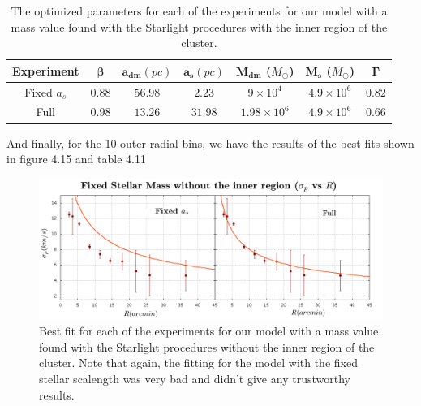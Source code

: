 \begin{table}[H]
\begin{center}
\begin{tabular}{| c| c| c| c| c| c| c|}
    \hline
    \textbf{Experiment} & $\mathbf{\beta}$ & $\mathbf{a_{dm}} (pc)$ & $\mathbf{a_{s}} (pc)$ & $\mathbf{M_{dm}}$ ($M_{\odot}$) & $\mathbf{M_{s}}$ ($M_{\odot}$) & $\mathbf{\Gamma}$\\ \hline
	Fixed $a_s$ &	$0.88$ &	$56.98$ &	$2.23$ &	$9 \times 10^{4}$ &	$4.9 \times 10 ^{6}$ &	$0.82$\\ \hline
	Full &	$0.98$ &	$13.26$ &	$31.98$ &	$1.98 \times 10^{6}$ &	$4.9 \times 10^{6}$ &	$0.66$\\ \hline
  \end{tabular} 
\caption[Optimized parameters for our model with a mass value based on the Starlight procedures with the inner region.]{The optimized parameters for each of the experiments for our model with a mass value found with the Starlight procedures with the inner region of the cluster.}
\end{center}
\end{table}

And finally, for the 10 outer radial bins, we have the results of the best fits shown in figure 4.15 and table 4.11

\begin{figure}[H]
\centering
\includegraphics[width=15cm]{images/Starlight_25_10.png}
\caption[Best fits for our model with a mass value based on the Starlight procedures without the inner region.]{Best fit for each of the experiments for our model with a mass value found with the Starlight procedures without the inner region of the cluster. Note that again, the fitting for the model with the fixed stellar scalength was very bad and didn't give any trustworthy results.}
\end{figure}

